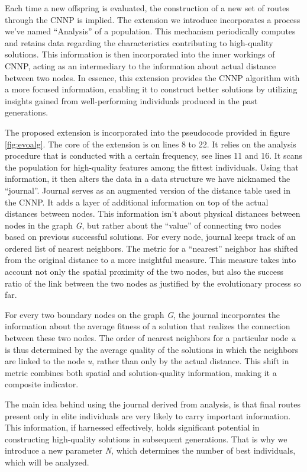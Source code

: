\documentclass[twoside]{ctuthesis}
\theoremstyle{plain}
\theoremstyle{definition}
\theoremstyle{note}
\begin{document}
Each time a new offspring is evaluated, the construction of a new set of routes through the CNNP is implied. 
The extension we introduce incorporates a process we've named ``Analysis'' of a population. This mechanism periodically computes and retains data regarding the characteristics contributing to high-quality solutions. This information is then incorporated into the inner workings of CNNP, acting as an intermediary to the information about actual distance between two nodes. In essence, this extension provides the CNNP algorithm with a more focused information, enabling it to construct better solutions by utilizing insights gained from well-performing individuals produced in the past generations.
	
The proposed extension is incorporated into the pseudocode provided in figure \ref{fig:evoalg}. The core of the extension is on lines 8 to 22. It relies on the analysis procedure that is conducted with a certain frequency, see lines 11 and 16.
It scans the population for high-quality features among the fittest individuals. Using that information, it then alters the data in a data structure we have nicknamed the ``journal''. Journal serves as an augmented version of the distance table used in the CNNP. It adds a layer of additional information on top of the actual distances between nodes. This information isn't about physical distances between nodes in the graph \emph{G}, but rather about the ``value'' of connecting two nodes based on previous successful solutions. For every node, journal keeps track of an ordered list of nearest neighbors. The metric for a ``nearest'' neighbor has shifted from the original distance to a more insightful measure. This measure takes into account not only the spatial proximity of the two nodes, but also the success ratio of the link between the two nodes as justified by the evolutionary process so far.

For every two boundary nodes on the graph \emph{G}, the journal incorporates the information about the average fitness of a solution that realizes the connection between these two nodes. The order of nearest neighbors for a particular node \emph{u} is thus determined by the average quality of the solutions in which the neighbors are linked to the node \emph{u}, rather than only by the actual distance. This shift in metric combines both spatial and solution-quality information, making it a composite indicator.

The main idea behind using the journal derived from analysis, is that final routes present only in elite individuals are very likely to carry important information. This information, if harnessed effectively, holds significant potential in constructing high-quality solutions in subsequent generations.
That is why we introduce a new parameter \emph{N}, which determines the number of best individuals, which will be analyzed.
\end{document}
